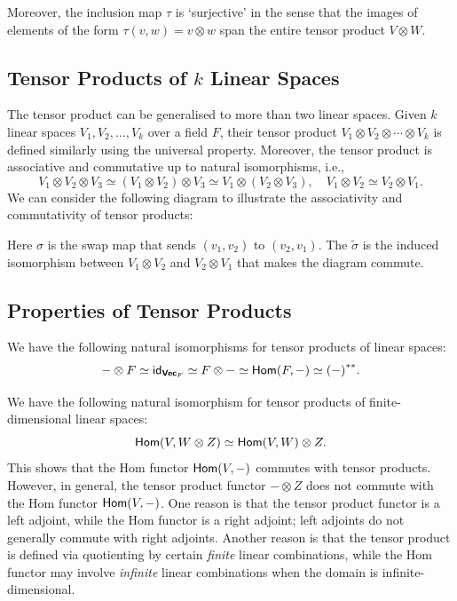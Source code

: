 Moreover, the inclusion map $\tau$ is `surjective' in the sense that the images of elements of the form $\tau(v, w) = v \otimes w$ span the entire tensor product $V \otimes W$.

\subsection{Tensor Products of $k$ Linear Spaces}
The tensor product can be generalised to more than two linear spaces. Given $k$ linear spaces $V_1, V_2, \ldots, V_k$ over a field $F$, their tensor product $V_1 \otimes V_2 \otimes \cdots \otimes V_k$ is defined similarly using the universal property. Moreover, the tensor product is associative and commutative up to natural isomorphisms, i.e.,
\[
	V_1 \otimes V_2 \otimes V_3 \simeq (V_1 \otimes V_2) \otimes V_3 \simeq V_1 \otimes (V_2 \otimes V_3), \quad V_1 \otimes V_2 \simeq V_2 \otimes V_1.
\]
We can consider the following diagram to illustrate the associativity and commutativity of tensor products:
\begin{center}
	\qquad
\end{center}
Here $\sigma$ is the swap map that sends $(v_1, v_2)$ to $(v_2, v_1)$. The $\widetilde{\sigma}$ is the induced isomorphism between $V_1 \otimes V_2$ and $V_2 \otimes V_1$ that makes the diagram commute.

\subsection{Properties of Tensor Products}
We have the following natural isomorphisms for tensor products of linear spaces:
\[
	- \otimes F \simeq \operatorname{\text{\normalfont\sffamily id}}_{\operatorname{\text{\normalfont\bf\sffamily Vec}}_F} \simeq F \otimes - \simeq \operatorname{\text{\normalfont\sffamily Hom}}(F, -) \simeq {(-)}^{**}.
\]

We have the following natural isomorphism for tensor products of finite-dimensional linear spaces:
\[
	\operatorname{\text{\normalfont\sffamily Hom}}(V, W \otimes Z) \simeq \operatorname{\text{\normalfont\sffamily Hom}}(V, W) \otimes Z.
\]
This shows that the Hom functor $\operatorname{\text{\normalfont\sffamily Hom}}(V, -)$ commutes with tensor products. However, in general, the tensor product functor $- \otimes Z$ does not commute with the Hom functor $\operatorname{\text{\normalfont\sffamily Hom}}(V, -)$. One reason is that the tensor product functor is a left adjoint, while the Hom functor is a right adjoint; left adjoints do not generally commute with right adjoints. Another reason is that the tensor product is defined via quotienting by certain \emph{finite} linear combinations, while the Hom functor may involve \emph{infinite} linear combinations when the domain is infinite-dimensional.

